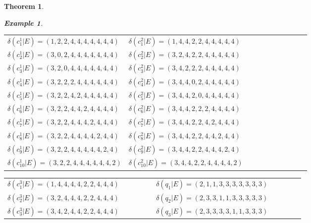 \documentclass[]{interact}
\theoremstyle{plain}%
\newtheorem{theorem}{Theorem}[section]
\theoremstyle{definition}
\newtheorem{example}{Example}[section]
\theoremstyle{remark}
\begin{document}
\begin{theorem}
\begin{example}
\begin{table}[h!]
    \end{table}
 \begin{table}[h!]
\begin{tabular}{|p{0.4\linewidth}|p{0.4\linewidth}|p{0.4\linewidth}|}
      \hline
        $\delta(c^1 _1|E)=(1,2,2,4,4,4,4,4,4,4)$ &  $\delta(c^2 _1|E)=(1,4,4,2,2,4,4,4,4,4)$    \\ 
       $\delta(c^1 _2|E)= (3,0,2,4,4,4,4,4,4,4)$ &  $\delta(c^2 _2|E)=(3,2,4,2,2,4,4,4,4,4)$    \\ 
       $\delta(c^1 _3|E)= (3,2,0,4,4,4,4,4,4,4)$ &  $\delta(c^2 _3|E)=(3,4,2,2,2,4,4,4,4,4)$   \\
     $\delta(c^1 _4|E)= (3,2,2,2,4,4,4,4,4,4)$ &  $\delta(c^2 _4|E)=(3,4,4,0,2,4,4,4,4,4)$   \\
       $\delta(c^1 _5|E)= (3,2,2,4,2,4,4,4,4,4)$ & $\delta(c^2 _5|E)=(3,4,4,2,0,4,4,4,4,4)$    \\
    $\delta(c^1 _6|E)= (3,2,2,4,4,2,4,4,4,4)$ &  $\delta(c^2 _6|E)=(3,4,4,2,2,2,4,4,4,4)$   \\
$\delta(c^1 _7|E)= (3,2,2,4,4,4,2,4,4,4)$ &  $\delta(c^2 _7|E)=(3,4,4,2,2,4,2,4,4,4)$    \\
$\delta(c^1 _8|E)= (3,2,2,4,4,4,4,2,4,4)$ &  $\delta(c^2 _8|E)=(3,4,4,2,2,4,4,2,4,4)$     \\
$\delta(c^1 _9|E)= (3,2,2,4,4,4,4,4,2,4)$ &  $\delta(c^2 _9|E)=(3,4,4,2,2,4,4,4,2,4)$  \\
$\delta(c^1 _{10}|E)= $$(3,2,2,4,4,4,4,4,4,2)$ &  $\delta(c^2 _{10}|E)=(3,4,4,2,2,4,4,4,4,2)$     \\
      \hline
    \end{tabular}
\end{table}
\newpage
\begin{table}[h!]
    \begin{tabular}{|p{0.4\linewidth}|p{0.4\linewidth}|}
      \hline
 $\delta(c^3 _1|E)=(1,4,4,4,4,2,2,4,4,4)$& $ \delta(q_1|E)=(2,1,1,3,3,3,3,3,3,3)$\\
 $\delta(c^3 _2|E)=(3,2,4,4,4,2,2,4,4,4)$  & $ \delta(q_2|E)=(2,3,3,1,1,3,3,3,3,3)$\\
  $\delta(c^3 _3|E)=(3,4,2,4,4,2,2,4,4,4)$ & $ \delta(q_3|E)=(2,3,3,3,3,1,1,3,3,3)$\\

\end{tabular}
\end{table}
\end{example}
\end{theorem}
\end{document}
